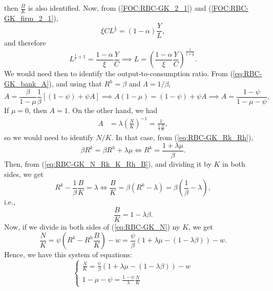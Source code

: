 \documentclass{article}
\begin{document}
	then $\frac{\Pi}{K}$ is also identified. Now, from (\ref{FOC:RBC-GK_2_1}) and (\ref{FOC:RBC-GK_firm_2_1}),
	\begin{equation}
		\xi C L^{\frac{1}{\nu}} = (1-\alpha) \frac{Y}{L},
	\end{equation}
	and therefore
	\begin{equation}
		L^{\frac{1}{\nu}+1} = \frac{1-\alpha}{\xi} \frac{Y}{C} \implies L = \left(\frac{1-\alpha}{\xi}\frac{Y}{C}\right)^{\frac{1}{1+\frac{1}{\nu}}}.
	\end{equation}
	We would need then to identify the output-to-consumption ratio. From (\ref{eq:RBC-GK_bank_A}), and using that $R^h = \beta$ and $\Lambda = 1/\beta$,
	\begin{equation}\label{eq:RBC-GK_mu_A}
		A = \frac{\beta}{1-\mu}\frac{1}{\beta}\left[(1-\psi)+\psi A\right]\implies A (1-\mu) = (1-\psi) + \psi A \implies A = \frac{1-\psi}{1-\mu-\psi},
	\end{equation}
	If $\mu = 0$, then $A = 1$. On the other hand, we had
	\begin{equation}
		\begin{aligned}
			A & = \lambda\left(\frac{N}{K}\right)^{-1} = \frac{1}{\frac{1}{\lambda}\frac{N}{K}},
		\end{aligned}
	\end{equation}
	so we would need to identify $N/K$. In that case, from (\ref{eq:RBC-GK_Rk_Rh}),
	\begin{equation}
		\beta R^k = \beta R^h + \lambda \mu \iff R^k = \frac{1+\lambda\mu}{\beta}.
	\end{equation}
	Then, from (\ref{eq:RBC-GK_N_Rk_K_Rh_B}), and dividing it by $K$ in both sides, we get
	\begin{equation}
		R^k - \frac{1}{\beta}\frac{B}{K} = \lambda \iff \frac{B}{K} = \beta\left(R^k-\lambda\right) = \beta\left(\frac{1}{\beta}-\lambda\right),
	\end{equation}
	i.e.,
	\begin{equation}
		\frac{B}{K} = 1 - \lambda \beta.
	\end{equation}
	Now, if we divide in both sides of (\ref{eq:RBC-GK_N}) ny $K$, we get
	\begin{equation}
	\frac{N}{K} = \psi \left(R^k - R^h\frac{B}{K}\right) - w = \frac{\psi}{\beta}(1+\lambda\mu - (1-\lambda\beta))-w.
	\end{equation}
Hence, we have this system of equations:
\begin{equation}
	\begin{cases}
		\frac{N}{K} = \frac{\psi}{\beta}(1+\lambda\mu - (1-\lambda\beta))-w\\
		1-\mu-\psi = \frac{1-\psi}{\lambda}\frac{N}{K}
	\end{cases}
\end{equation}
\end{document}
